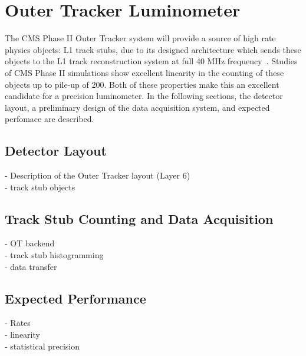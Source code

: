 \chapter{Outer Tracker Luminometer}

The CMS Phase II Outer Tracker system will provide a source of high rate physics objects: L1 track stubs,
due to its designed architecture which sends these objects to the L1 track reconstruction system at full 40 MHz frequency~\cite{CERN-LHCC-2017-009}.
Studies of CMS Phase II simulations show excellent linearity in the counting of these objects up to pile-up of 200.
Both of these properties make this an excellent candidate for a precision luminometer.
In the following sections, the detector layout, a preliminary design of the data acquisition system, and expected perfomace are described.


\section{Detector Layout }
- Description of the Outer Tracker layout (Layer 6)\\

- track stub objects

\section{Track Stub Counting and Data Acquisition}
- OT backend \\ 
- track stub histogramming \\
- data transfer 

\section{Expected Performance}
- Rates\\
- linearity \\
- statistical precision

\clearpage

